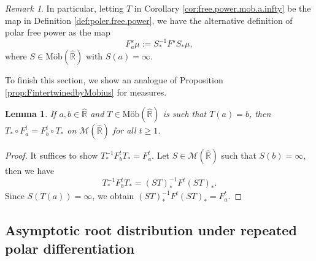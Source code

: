 \documentclass[reqno,11pt]{amsart}
\newtheorem{lemma}[theorem]{Lemma}
\theoremstyle{remark}
\newtheorem{remark}[theorem]{Remark}
\newcommand{\rr}{\mathbb{R}}
\newcommand{\MM}{\mathcal{M}}
\newcommand{\freepower}[1]{F^{#1}}
\newcommand{\pfreepower}[2]{F_{#1}^{#2}}
\newcommand{\mobr}{\text{Möb}(\hat{\rr})}
\begin{document}
\begin{remark}
In particular, letting $T$ in Corollary \ref{cor:free.power.mob.a.infty} be the map in Definition \ref{def:poler.free.power}, we have the alternative definition of polar free power as the map
$$ \pfreepower{a}{s} \mu := S^{-1}_*\freepower{s} S_*\mu,$$
where $S\in\mobr$ with $S(a)=\infty$.    
\end{remark}

To finish this section, we show an analogue of Proposition \ref{prop:FintertwinedbyMobius} for measures. 

\begin{lemma}\label{lem:FintertwinedbyMobius}
If $a,b\in \hat{\rr}$ and $T\in\mobr$ is such that $T(a)=b$, then $T_* \circ \pfreepower{a}{t}= \pfreepower{b}{t} \circ T_* $ on $\MM(\hat{\rr}) $ for all $t\geq 1$.
\end{lemma}

\begin{proof}
    It suffices to show $ T_*^{-1} \pfreepower{b}{t}T_* =\pfreepower{a}{t} $. Let $S\in \MM(\hat{\rr})$ such that $ S( b ) = \infty $, then we have $$ T_*^{-1} \pfreepower{b}{t}T_* = (ST)_*^{-1} \freepower{t}(ST)_*. $$ Since $ S(T(a)) = \infty $, we obtain $ (ST)_*^{-1} \freepower{t}(ST)_* =  \pfreepower{a}{t}$.
\end{proof}

\subsection{Asymptotic root distribution under repeated polar differentiation}
\end{document}
